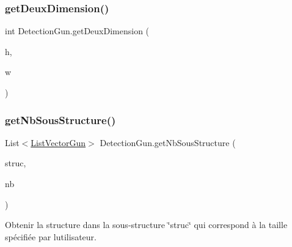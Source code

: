 \subsubsection{\texorpdfstring{get\+Deux\+Dimension()}{getDeuxDimension()}}
{\footnotesize\ttfamily int Detection\+Gun.\+get\+Deux\+Dimension (\begin{DoxyParamCaption}\item[{int}]{h,  }\item[{int}]{w }\end{DoxyParamCaption})\hspace{0.3cm}{\ttfamily [inline]}}

\mbox{\label{class_detection_gun_a0a14866d2727aea5d457121bd646f3bb}} 
\subsubsection{\texorpdfstring{get\+Nb\+Sous\+Structure()}{getNbSousStructure()}}
{\footnotesize\ttfamily List$<$\mbox{\hyperlink{class_list_vector_gun}{List\+Vector\+Gun}}$>$ Detection\+Gun.\+get\+Nb\+Sous\+Structure (\begin{DoxyParamCaption}\item[{List$<$ \mbox{\hyperlink{class_list_vector_gun}{List\+Vector\+Gun}} $>$}]{struc,  }\item[{int}]{nb }\end{DoxyParamCaption})\hspace{0.3cm}{\ttfamily [inline]}}



Obtenir la structure dans la sous-\/structure \char`\"{}struc\char`\"{} qui correspond à la taille spécifiée par l\textquotesingle{}utilisateur. 


